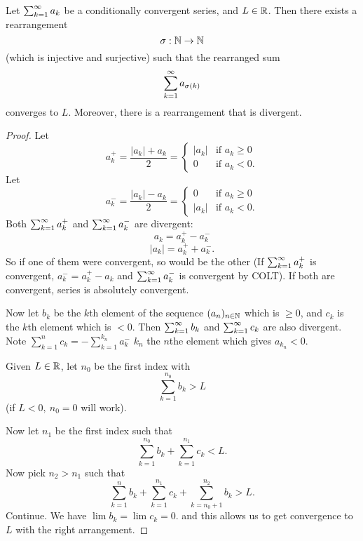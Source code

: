 \documentclass[10pt, a4paper]{article}
\newcommand{\seq}[1][x]{(#1_n)_{n \in \N}}
\begin{document}
\begin{theorem}
    Let $\sum_{k = 1}^{\infty} a_k$ be a conditionally convergent series,
    and $L \in \mathbb{R}$.
    Then there exists a rearrangement
    \[
    \sigma : \mathbb{N} \to \mathbb{N}
    \]
    (which is injective and surjective)
    such that the rearranged sum
    \[
    \sum_{k = 1}^{\infty} a_{\sigma(k)}
    \]
    converges to $L$.
    Moreover,
    there is a rearrangement that is divergent.
    \begin{proof}
        Let
        \[
        a_k^{+} = \frac{|a_k| + a_k}{2} = \begin{cases}
            |a_k| & \text{if } a_k \geq 0 \\
            0 & \text{if } a_k < 0.
        \end{cases}
        \]
        Let
        \[
        a_k^{-} = \frac{|a_k| - a_k}{2} = \begin{cases}
            0 & \text{if } a_k \geq 0 \\
            |a_k| & \text{if } a_k < 0.
        \end{cases}
        \]
        Both $\sum_{k = 1}^{\infty} a_k^{+}$ and $\sum_{k = 1}^{\infty} a_k^{-}$ are divergent:
        \[
        a_k = a_k^{+} - a_k^{-}
        \]
        \[
        |a_k| = a_k^{+} + a_k^{-}.
        \]
        So if one of them were convergent,
        so would be the other
        (If $\sum_{k = 1}^{\infty} a_k^{+}$ is convergent,
        $a_k^{-} = a_k^{+} - a_k$ and $\sum_{k = 1}^{\infty} a_k^{-}$ is convergent by COLT).
        If both are convergent,
        series is absolutely convergent.

        Now let $b_k$ be the $k$th element of the sequence $\seq[a]$ which is $\geq 0$,
        and $c_k$ is the $k$th element which is $< 0$.
        Then $\sum_{k = 1}^{\infty} b_k$ and $\sum_{k = 1}^{\infty} c_k$ are also divergent.
        Note $\sum_{k = 1}^{n}c_k = -\sum_{k = 1}^{k_n}a_k^{-}$
        $k_n$ the $n$the element which gives $a_{k_n} < 0$.

        Given $L \in \mathbb{R}$,
        let $n_0$ be the first index with
        \[
        \sum_{k = 1}^{n_0}b_k > L
        \]
        (if $L < 0,\ n_0 = 0$ will work).

        Now let $n_1$ be the first index such that
        \[
        \sum_{k = 1}^{n_0}b_k + \sum_{k = 1}^{n_1}c_k < L.
        \]
        Now pick $n_2 > n_1$ such that
        \[
        \sum_{k = 1}^{n}b_k + \sum_{k = 1}^{n_1}c_k + \sum_{k = n_0 + 1}^{n_2}b_k > L.
        \]
        Continue.
        We have $\lim b_k = \lim c_k = 0$.
        and this allows us to get convergence to $L$ with the right arrangement.
    \end{proof}
\end{theorem}
\end{document}
